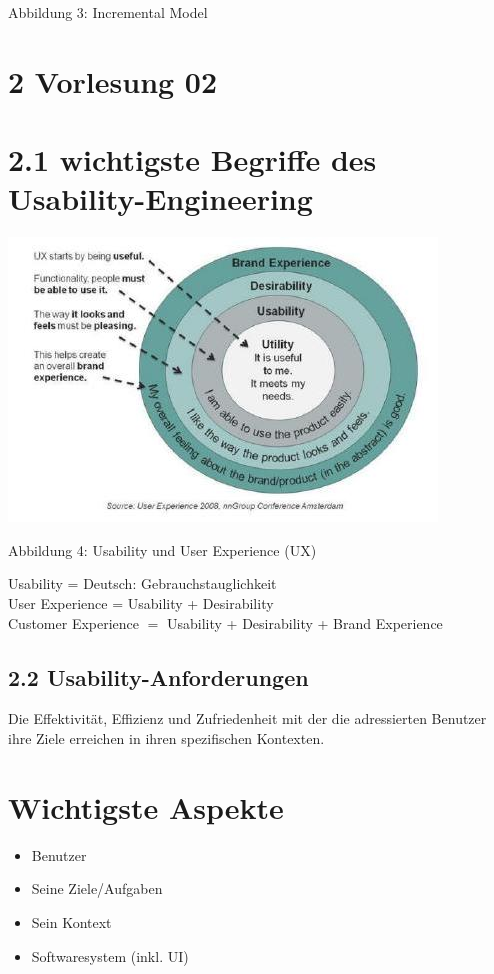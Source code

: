 \documentclass[10pt]{article}
\begin{document}
Abbildung 3: Incremental Model

\section*{2 Vorlesung 02}
\section*{2.1 wichtigste Begriffe des Usability-Engineering}
\begin{center}
\includegraphics[width=\linewidth]{images/2024_12_29_0d1d7b5551ea1b4b41bdg-02}
\end{center}

\begin{displayquote}
Abbildung 4: Usability und User Experience (UX)
\end{displayquote}

Usability = Deutsch: Gebrauchstauglichkeit\\
User Experience = Usability + Desirability\\
Customer Experience $=$ Usability + Desirability + Brand Experience

\subsection*{2.2 Usability-Anforderungen}
Die Effektivität, Effizienz und Zufriedenheit mit der die adressierten Benutzer ihre Ziele erreichen in ihren spezifischen Kontexten.

\section*{Wichtigste Aspekte}
\begin{itemize}
  \item Benutzer
  \item Seine Ziele/Aufgaben
  \item Sein Kontext
  \item Softwaresystem (inkl. UI)
\end{itemize}
\end{document}

